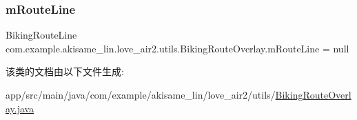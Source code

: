 \subsubsection{\texorpdfstring{mRouteLine}{mRouteLine}}
{\footnotesize\ttfamily Biking\+Route\+Line com.\+example.\+akisame\+\_\+lin.\+love\+\_\+air2.\+utils.\+Biking\+Route\+Overlay.\+m\+Route\+Line = null\hspace{0.3cm}{\ttfamily [private]}}



该类的文档由以下文件生成\+:\begin{DoxyCompactItemize}
\item 
app/src/main/java/com/example/akisame\+\_\+lin/love\+\_\+air2/utils/\mbox{\hyperlink{_biking_route_overlay_8java}{Biking\+Route\+Overlay.\+java}}\end{DoxyCompactItemize}
